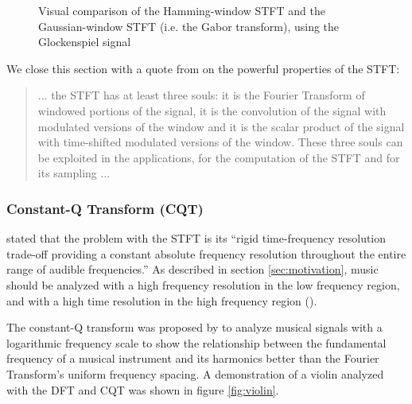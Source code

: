 \documentclass[report.tex]{subfiles}
\begin{document}
\begin{figure}[ht]
	\caption{Visual comparison of the Hamming-window STFT and the Gaussian-window STFT (i.e. the Gabor transform), using the Glockenspiel signal}
	\label{fig:stfts}
\end{figure}

We close this section with a quote from \textcite{doerflersouls} on the powerful properties of the STFT:

\begin{quote}
       ... the STFT has at least three souls: it is the Fourier Transform of windowed portions of the signal, it is the convolution of the signal with modulated versions of the window and it is the scalar product of the signal with time-shifted modulated versions of the window. These three souls can be exploited in the applications, for the computation of the STFT and for its sampling ...
\end{quote}

\newpagefill

\subsubsection{Constant-Q Transform (CQT)}
\label{sec:cqt}

\textcite{cqtransient} stated that the problem with the STFT is its ``rigid time-frequency resolution trade-off providing a constant absolute frequency resolution throughout the entire range of audible frequencies.'' As described in section \ref{sec:motivation}, music should be analyzed with a high frequency resolution in the low frequency region, and with a high time resolution in the high frequency region (\cite{doerflerphd, cqtransient}). 

The constant-Q transform was proposed by \textcite{jbrown, msp} to analyze musical signals with a logarithmic frequency scale to show the relationship between the fundamental frequency of a musical instrument and its harmonics better than the Fourier Transform's uniform frequency spacing. A demonstration of a violin analyzed with the DFT and CQT was shown in figure \ref{fig:violin}.
\end{document}
